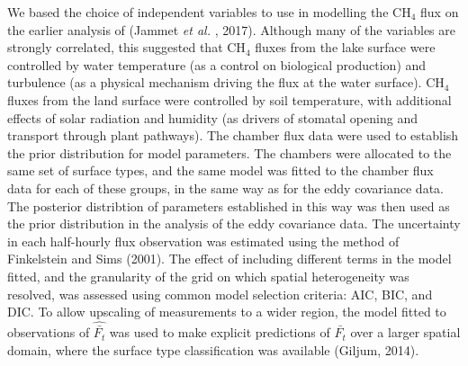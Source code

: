 We based the choice of independent variables to use in modelling the
CH\(_4\) flux on the earlier analysis of (Jammet \emph{et al.} , 2017).
Although many of the variables are strongly correlated, this suggested
that CH\(_4\) fluxes from the lake surface were controlled by water
temperature (as a control on biological production) and turbulence (as a
physical mechanism driving the flux at the water surface). CH\(_4\)
fluxes from the land surface were controlled by soil temperature, with
additional effects of solar radiation and humidity (as drivers of
stomatal opening and transport through plant pathways). The chamber flux
data were used to establish the prior distribution for model parameters.
The chambers were allocated to the same set of surface types, and the
same model was fitted to the chamber flux data for each of these groups,
in the same way as for the eddy covariance data. The posterior
distribtion of parameters established in this way was then used as the
prior distribution in the analysis of the eddy covariance data. The
uncertainty in each half-hourly flux observation was estimated using the
method of Finkelstein and Sims (2001). The effect of including different
terms in the model fitted, and the granularity of the grid on which
spatial heterogeneity was resolved, was assessed using common model
selection criteria: AIC, BIC, and DIC. To allow upscaling of
measurements to a wider region, the model fitted to observations of
\(\widehat{\bar{F_t}}\) was used to make explicit predictions of
\(\bar{F_t}\) over a larger spatial domain, where the surface type
classification was available (Giljum, 2014).